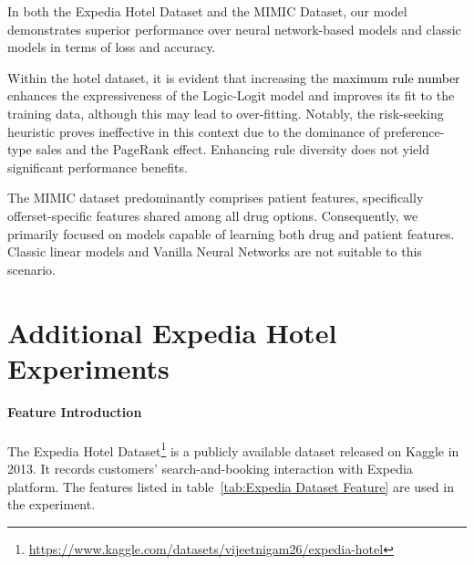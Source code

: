 \documentclass{article} %
\begin{document}
\begin{table}[ht]
\caption{Choice prediction on the Expedia Hotel dataset. We report Negative log likelihood (NLL) loss and Top-1 choice prediction accuracy of the training and testing set. Our Logit-Logit model performs best. NM refers to the normal mode of our model, while RS indicates the risk-seeking mode. We extract 30 rules for both types.}
\label{tab:expedia_results}
\end{table}




%

In both the Expedia Hotel Dataset and the MIMIC Dataset, our model demonstrates superior performance over neural network-based models and classic models in terms of loss and accuracy. 

Within the hotel dataset, it is evident that increasing the \textcolor{black}{maximum rule number} enhances the expressiveness of the Logic-Logit model and improves its fit to the training data, although this may lead to over-fitting. Notably, the risk-seeking heuristic proves ineffective in this context due to the dominance of preference-type sales and the PageRank effect. Enhancing rule diversity does not yield significant performance benefits.

The MIMIC dataset predominantly comprises patient features, specifically offerset-specific features shared among all drug options. Consequently, we primarily focused on models capable of learning both drug and patient features. Classic linear models and Vanilla Neural Networks are not suitable to this scenario.




\section{Additional Expedia Hotel Experiments} 
\label{appendix:Expedia Hotel Data}
\paragraph{Feature Introduction}
The Expedia Hotel Dataset\footnote{\url{https://www.kaggle.com/datasets/vijeetnigam26/expedia-hotel}} is a publicly available dataset released on Kaggle in 2013. It records customers' search-and-booking interaction with Expedia platform. The features listed in table~\ref{tab:Expedia Dataset Feature} are used in the experiment.
\end{document}
